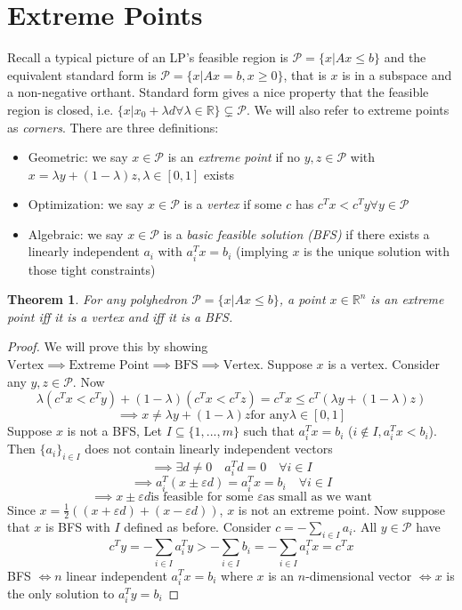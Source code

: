 \documentclass[12pt,oneside]{book}
\numberwithin{equation}{section}
\theoremstyle{definition}
\theoremstyle{plain}
\newtheorem{theorem}{Theorem}[section]
\theoremstyle{remark}
\newcommand{\R}{\mathbb{R}}
\newcommand{\poly}{\mathcal{P}}
\begin{document}
\section{Extreme Points}
Recall a typical picture of an LP's feasible region is $\mathcal{P} = \{x|Ax \le b\}$ and the equivalent standard form is $\mathcal{P}=\{x| Ax=b, x\ge 0\}$, that is $x$ is in a subspace and a non-negative orthant. Standard form gives a nice property that the feasible region is closed, i.e. $\{x|x_0 + \lambda d \forall \lambda \in \R\} \subsetneq \mathcal{P}$. We will also refer to extreme points as \emph{corners}. There are three definitions:
\begin{itemize}
    \item Geometric: we say $x \in \mathcal{P}$ is an \emph{extreme point} if no $y,z \in \mathcal{P}$ with $x = \lambda y + (1-\lambda)z, \lambda \in [0,1]$ exists
    \item Optimization: we say $x \in \mathcal{P}$ is a \emph{vertex} if some $c$ has $c^Tx < c^Ty \forall y \in \mathcal{P}$
    \item Algebraic: we say $x \in \mathcal{P}$ is a \emph{basic feasible solution (BFS)} if there exists a linearly independent $a_i$ with $a_i^T x = b_i$ (implying $x$ is the unique solution with those tight constraints)
\end{itemize}
\begin{theorem}
    For any polyhedron $\poly = \{x | Ax \le b\}$, a point $x \in \R^n$ is an extreme point iff it is a vertex and iff it is a BFS. 
\end{theorem}
\begin{proof}
    We will prove this by showing $\text{Vertex} \implies \text{Extreme Point} \implies \text{BFS} \implies \text{Vertex}$. Suppose $x$ is a vertex. Consider any $y,z \in \poly$. Now 
    $$
    \lambda (c^Tx < c^T y)+(1-\lambda)(c^Tx < c^T z) = c^T x \le c^T(\lambda y + (1-\lambda)z) 
    $$
    $$
    \implies x \ne \lambda y + (1-\lambda)z \text{for any} \lambda \in [0,1]
    $$
    Suppose $x$ is not a BFS, Let $I \subseteq \{1,...,m\}$ such that $a_i^Tx=b_i$ ($i \notin I, a_i^Tx < b_i$). Then $\{a_i\}_{i \in I}$ does not contain linearly independent vectors
    $$
    \implies \exists d \ne 0 \quad a_i^T d = 0 \quad \forall i \in I
    $$
    $$
    \implies a_i^T (x \pm \varepsilon d) = a_i^T x = b_i \quad \forall i \in I
    $$
    $$
    \implies x \pm \varepsilon d \text{is feasible for some } \varepsilon \text{as small as we want}
    $$
    Since $x = \frac{1}{2} ((x+\varepsilon d)+(x-\varepsilon d))$, $x$ is not an extreme point. Now suppose that $x$ is BFS with $I$ defined as before. Consider $c = -\sum_{i \in I} a_i$. All $y \in \poly$ have
    $$
    c^T y = -\sum_{i \in I}a_i^T y > -\sum_{i \in I} b_i = -\sum_{i \in I}a_i^T x = c^Tx
    $$
    BFS $\iff n$ linear independent $a_i^T x = b_i$ where $x$ is an $n$-dimensional vector $\iff x$ is the only solution to $a_i^T y = b_i$
\end{proof}
\end{document}
